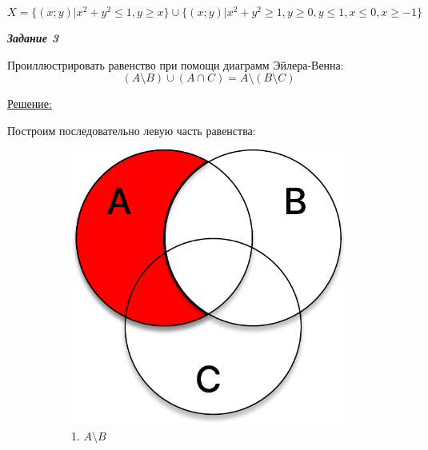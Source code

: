 \documentclass[11pt]{article}
\begin{document}
$$X=\{(x;y) \vert x^2+y^2 \leq 1, y \geq x\} \cup \{(x;y)\vert
x^2 + y^2 \geq 1, y \geq 0, y \leq 1, x \leq 0, x \geq -1\}$$

\pagebreak

\textit{\textbf{Задание 3}}

Проиллюстрировать равенство при помощи диаграмм Эйлера-Венна:
$$(A \setminus B) \cup (A \cap C) = A \setminus (B \setminus C)$$

\underline{Решение:}

Построим последовательно левую часть равенства:

\begin{figure}[h]
        \captionsetup[subfigure]{labelformat=empty}
        \centering
        \begin{subfigure}{.32\textwidth}
                \centering
                \includegraphics[width=1\linewidth]{t3_1_1.pdf}
                \caption{1. $A \setminus B$}
        \end{subfigure}
        \begin{subfigure}{.32\textwidth}
                \centering

\end{subfigure}
\end{figure}
\end{document}
